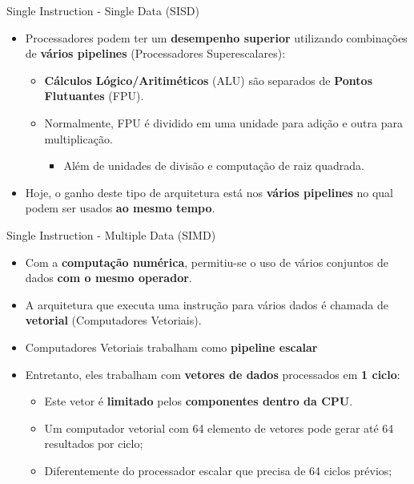 \begin{frame}{Single Instruction - Single Data (SISD)}
    \begin{itemize}
		\item Processadores podem ter um \textbf{desempenho superior} utilizando combinações de \textbf{vários pipelines} (Processadores Superescalares):
		\begin{itemize}
			\item \textbf{Cálculos Lógico/Aritiméticos} (ALU) são separados de \textbf{Pontos Flutuantes} (FPU).
			\item Normalmente, FPU é dividido em uma unidade para adição e outra para multiplicação.
			\begin{itemize}
			    \item Além de unidades de divisão e computação de raiz quadrada.
			\end{itemize}

		\end{itemize}

		\item Hoje, o ganho deste tipo de arquitetura está nos \textbf{vários pipelines} no qual podem ser usados \textbf{ao mesmo tempo}.
	\end{itemize}

\end{frame}









\begin{frame}{Single Instruction - Multiple Data (SIMD)}
	\begin{itemize}
		\item Com a \textbf{computação numérica}, permitiu-se o uso de vários conjuntos de dados \textbf{com o mesmo operador}.
		\item A arquitetura que executa uma instrução para vários dados é chamada de \textbf{vetorial} (Computadores Vetoriais).
		\item Computadores Vetoriais trabalham como \textbf{pipeline escalar}
		\item Entretanto, eles trabalham com \textbf{vetores de dados} processados em \textbf{1 ciclo}:
		\begin{itemize}
			\item Este vetor é \textbf{limitado} pelos \textbf{componentes dentro da CPU}.
			\item Um computador vetorial com 64 elemento de vetores pode gerar até 64 resultados por ciclo;
			\item Diferentemente do processador escalar que precisa de 64 ciclos prévios;
		\end{itemize}

	\end{itemize}

	
\end{frame}


